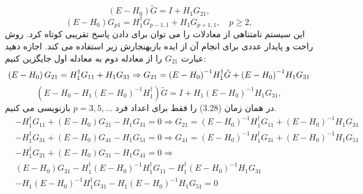 \begin{equation}
    \left( E-{{H}_{0}} \right)\tilde{G}=I+{{H}_{1}}{{G}_{21}},
\end{equation}
\begin{equation}
    \left( E-{{H}_{0}} \right){{G}_{p1}}=H_{1}^{\dagger }{{G}_{p-1,1}}+{{H}_{1}}{{G}_{p+1,1}},\quad p\ge 2,
\end{equation}
این سیستم نامتناهی از معادلات را می توان برای دادن پاسخ تقریبی کوتاه کرد. روش راحت و پایدار عددی برای انجام آن از ایده بازبهنجارش زیر استفاده می کند. اجازه دهید عبارت $G_{21}$ را از معادله دوم به معادله اول جایگزین کنیم:
\begin{equation}
    \left( E-{{H}_{0}} \right){{G}_{21}}=H_{1}^{\dagger }{{G}_{11}}+{{H}_{1}}{{G}_{31}}\Rightarrow {{G}_{21}}={{\left( E-{{H}_{0}} \right)}^{-1}}H_{1}^{\dagger }\tilde{G}+{{\left( E-{{H}_{0}} \right)}^{-1}}{{H}_{1}}{{G}_{31}}\\
\end{equation}
\begin{equation}
    \left( E-{{H}_{0}}-{{H}_{1}}{{\left( E-{{H}_{0}} \right)}^{-1}}H_{1}^{\dagger } \right)\tilde{G}=I+{{H}_{1}}{{\left( E-{{H}_{0}} \right)}^{-1}}{{H}_{1}}{{G}_{31}},
\end{equation}
در همان زمان (3.28) را فقط برای اعداد فرد $p = 3,5,\dots$ بازنویسی می کنیم.
\begin{equation}
    \begin{aligned}
          & -H_{1}^{\dagger }{{G}_{11}}+\left( E-{{H}_{0}} \right){{G}_{21}}-{{H}_{1}}{{G}_{31}}=0\Rightarrow {{G}_{21}}={{\left( E-{{H}_{0}} \right)}^{-1}}H_{1}^{\dagger }{{G}_{11}}+{{\left( E-{{H}_{0}} \right)}^{-1}}{{H}_{1}}{{G}_{31}} \\ 
         & -H_{1}^{\dagger }{{G}_{31}}+\left( E-{{H}_{0}} \right){{G}_{41}}-{{H}_{1}}{{G}_{51}}=0\Rightarrow {{G}_{41}}={{\left( E-{{H}_{0}} \right)}^{-1}}H_{1}^{\dagger }{{G}_{31}}+{{\left( E-{{H}_{0}} \right)}^{-1}}{{H}_{1}}{{G}_{51}} \\ 
         & -H_{1}^{\dagger }{{G}_{21}}+\left( E-{{H}_{0}} \right){{G}_{31}}-{{H}_{1}}{{G}_{41}}=0\Rightarrow  \\ 
         & \left( E-{{H}_{0}} \right){{G}_{31}}-H_{1}^{\dagger }{{\left( E-{{H}_{0}} \right)}^{-1}}H_{1}^{\dagger }{{G}_{11}}-H_{1}^{\dagger }{{\left( E-{{H}_{0}} \right)}^{-1}}{{H}_{1}}{{G}_{31}} \\ 
         & -{{H}_{1}}{{\left( E-{{H}_{0}} \right)}^{-1}}H_{1}^{\dagger }{{G}_{31}}-{{H}_{1}}{{\left( E-{{H}_{0}} \right)}^{-1}}{{H}_{1}}{{G}_{51}}=0 \\ 
    \end{aligned}
\end{equation}
